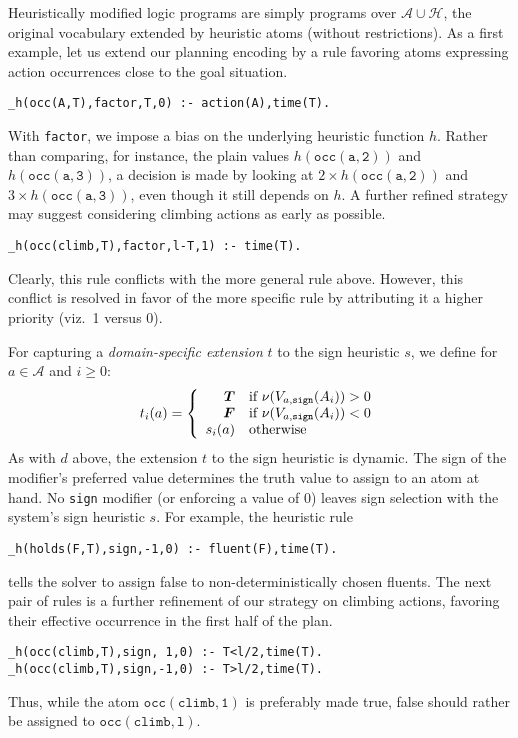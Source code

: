 Heuristically modified logic programs are simply programs over $\mathcal{A}\cup\mathcal{H}$,
the original vocabulary extended by heuristic atoms (without restrictions).
As a first example,
let us extend our planning encoding by a rule favoring atoms expressing action occurrences close to
the goal situation.
\begin{lstlisting}
_h(occ(A,T),factor,T,0) :- action(A),time(T).
\end{lstlisting}
With \texttt{factor}, we impose a bias on the underlying heuristic function $h$.
Rather than comparing, for instance,
the plain values $h(\mathtt{occ(a,2)})$ and $h(\mathtt{occ(a,3)})$,
a decision is made by looking at $2\times h(\mathtt{occ(a,2)})$ and  $3\times h(\mathtt{occ(a,3)})$,
even though it still depends on $h$.
A further refined strategy may suggest considering climbing actions as early as possible.
\begin{lstlisting}
_h(occ(climb,T),factor,l-T,1) :- time(T).
\end{lstlisting}
Clearly, this rule conflicts with the more general rule above.
However, this conflict is resolved in favor of the more specific rule by attributing it a higher
priority (viz.~1 versus 0).


For capturing a \emph{domain-specific extension} $t$ to the sign heuristic $s$,
we define for $a\in\mathcal{A}$ and $i\geq 0$:
\[
t_i(a)=
\left\{
  \begin{array}{rl}
    \boldsymbol{T} &\text{if }
           \nu(V_{a,\mathtt{sign}}(A_i))>0
           \\
    \boldsymbol{F}&\text{if }
           \nu(V_{a,\mathtt{sign}}(A_i))<0
           \\
    s_i(a)&\text{otherwise}
  \end{array}
\right.
\]
As with $d$ above, the extension $t$ to the sign heuristic is dynamic.
The sign of the modifier's preferred value determines the truth value to assign to an atom at hand.
No \texttt{sign} modifier (or enforcing a value of 0) leaves sign selection with the system's sign heuristic $s$.
%
For example, the heuristic rule
\begin{lstlisting}
_h(holds(F,T),sign,-1,0) :- fluent(F),time(T).
\end{lstlisting}
tells the solver to assign false to non-deterministically chosen fluents.
%
The next pair of rules is a further refinement of our strategy on climbing actions,
favoring their effective occurrence in the first half of the plan.
\begin{lstlisting}
_h(occ(climb,T),sign, 1,0) :- T<l/2,time(T).
_h(occ(climb,T),sign,-1,0) :- T>l/2,time(T).
\end{lstlisting}
Thus, while the atom $\mathtt{occ(climb,1)}$ is preferably made true,
false should rather be assigned to $\mathtt{occ(climb,l)}$.

